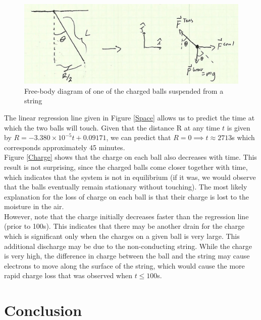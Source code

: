\documentclass[oneside,12pt]{amsart}
\begin{document}
	\begin{figure}[h]
	\includegraphics[width=\linewidth,scale=0.01]{scan.png}
	\caption{Free-body diagram of one of the charged balls suspended from a string}
	\label{scn}
\end{figure}


\indent The linear regression line given in Figure \ref{Space} allows us to predict the time at which the two balls will touch. Given that the distance R at any time $t$ is given by $R = -3.380\times10^{-5}t + 0.09171$, we can predict that $R=0 \implies t \approx 2713$s which corresponds approximately 45 minutes.\\

\indent Figure \ref{Charge} shows that the charge on each ball also decreases with time. This result is not surprising, since the charged balls come closer together with time, which indicates that the system is not in equilibrium (if it was, we would observe that the balls eventually remain stationary without touching). The most likely explanation for the loss of charge on each ball is that their charge is lost to the moisture in the air.\\

\indent However, note that the charge initially decreases faster than the regression line (prior to 100s). This indicates that there may be another drain for the charge which is significant only when the charges on a given ball is very large. This additional discharge may be due to the non-conducting string. While the charge is very high, the difference in charge between the ball and the string may cause electrons to move along the surface of the string, which would cause the more rapid charge loss that was observed when $t\le 100$s. 

\section{Conclusion}
\newpage
\printbibliography
\end{document}

